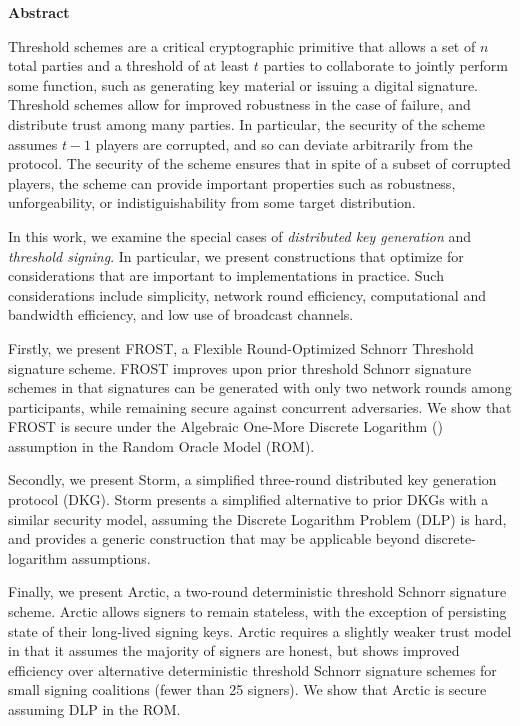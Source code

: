  \noindent


\cleardoublepage
{}    %

\begin{center}\textbf{Abstract}\end{center}

  Threshold schemes are a critical cryptographic primitive that allows a set of $n$ total parties and a threshold of at least $t$ parties to collaborate to jointly perform some function,
  such as generating key material or issuing a digital signature.
  Threshold schemes allow for improved robustness in the case of failure,
  and distribute trust among many parties.
  In particular,
  the security of the scheme assumes $t-1$ players are corrupted,
  and so can deviate arbitrarily from the protocol.
  The security of the scheme ensures that in spite of a subset of corrupted players,
  the scheme can provide important properties such as robustness,
  unforgeability,
  or indistiguishability from some target distribution.

  In this work,
  we examine the special cases of \emph{distributed key generation} and \emph{threshold signing}.
  In particular,
  we present constructions that optimize for considerations that are important to implementations in practice.
  Such considerations include
  simplicity,
  network round efficiency,
  computational and bandwidth efficiency,
  and low use of broadcast channels.

  Firstly,
  we present FROST,
  a Flexible Round-Optimized Schnorr Threshold signature scheme.
  FROST improves upon prior threshold Schnorr signature schemes in that signatures can be generated with only two network rounds among participants,
  while remaining secure against concurrent adversaries.
  We show that FROST is secure under the Algebraic One-More Discrete Logarithm (\AOMDL) assumption in the Random Oracle Model (ROM).

  Secondly,
  we present Storm,
  a simplified three-round distributed key generation protocol (DKG).
  Storm presents a simplified alternative to prior DKGs with a similar security model,
  assuming the Discrete Logarithm Problem (DLP) is hard,
  and provides a generic construction that may be applicable beyond discrete-logarithm assumptions.

  \begin{sloppypar}
  Finally,
  we present Arctic,
  a two-round deterministic threshold Schnorr signature scheme.
  Arctic allows signers to remain stateless,
  with the exception of persisting state of their long-lived signing keys.
  Arctic requires a slightly weaker trust model in that it assumes the majority of signers are honest,
  but shows improved efficiency over alternative deterministic threshold Schnorr signature schemes for small signing coalitions
  (fewer than 25 signers).
  We show that Arctic is secure assuming DLP in the ROM.
  \end{sloppypar}




